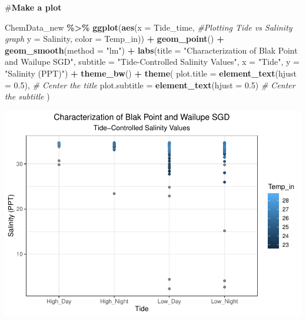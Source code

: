 \documentclass[
]{article}
\newenvironment{Shaded}{\begin{snugshade}}{\end{snugshade}}
\newcommand{\AttributeTok}[1]{\textcolor[rgb]{0.13,0.29,0.53}{#1}}
\newcommand{\CommentTok}[1]{\textcolor[rgb]{0.56,0.35,0.01}{\textit{#1}}}
\newcommand{\FloatTok}[1]{\textcolor[rgb]{0.00,0.00,0.81}{#1}}
\newcommand{\FunctionTok}[1]{\textcolor[rgb]{0.13,0.29,0.53}{\textbf{#1}}}
\newcommand{\NormalTok}[1]{#1}
\newcommand{\SpecialCharTok}[1]{\textcolor[rgb]{0.81,0.36,0.00}{\textbf{#1}}}
\newcommand{\StringTok}[1]{\textcolor[rgb]{0.31,0.60,0.02}{#1}}
\begin{document}
\#\textbf{Make a plot}

\begin{Shaded}
\begin{Highlighting}[]
\NormalTok{ChemData\_new }\SpecialCharTok{\%\textgreater{}\%}
 \FunctionTok{ggplot}\NormalTok{(}\FunctionTok{aes}\NormalTok{(}\AttributeTok{x =}\NormalTok{ Tide\_time, }\CommentTok{\#Plotting Tide vs Salinity graph}
            \AttributeTok{y =}\NormalTok{ Salinity, }
            \AttributeTok{color =}\NormalTok{ Temp\_in)) }\SpecialCharTok{+}
  \FunctionTok{geom\_point}\NormalTok{() }\SpecialCharTok{+}
  \FunctionTok{geom\_smooth}\NormalTok{(}\AttributeTok{method =} \StringTok{"lm"}\NormalTok{) }\SpecialCharTok{+}
  \FunctionTok{labs}\NormalTok{(}\AttributeTok{title =} \StringTok{"Characterization of Blak Point and Wailupe SGD"}\NormalTok{,}
       \AttributeTok{subtitle =} \StringTok{"Tide{-}Controlled Salinity Values"}\NormalTok{,}
      \AttributeTok{x =} \StringTok{"Tide"}\NormalTok{,}
       \AttributeTok{y =} \StringTok{"Salinity (PPT)"}\NormalTok{) }\SpecialCharTok{+}
  \FunctionTok{theme\_bw}\NormalTok{() }\SpecialCharTok{+}
  \FunctionTok{theme}\NormalTok{(}
    \AttributeTok{plot.title =} \FunctionTok{element\_text}\NormalTok{(}\AttributeTok{hjust =} \FloatTok{0.5}\NormalTok{),  }\CommentTok{\# Center the title}
    \AttributeTok{plot.subtitle =} \FunctionTok{element\_text}\NormalTok{(}\AttributeTok{hjust =} \FloatTok{0.5}\NormalTok{)  }\CommentTok{\# Center the subtitle}
\NormalTok{  )}
\end{Highlighting}
\end{Shaded}

\begin{center}\includegraphics{../Output/sgd_salTemp-1} \end{center}
\end{document}
